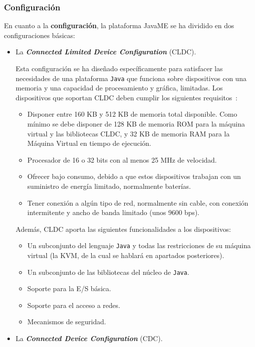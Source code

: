\subsubsection{Configuración}
En cuanto a la \textbf{configuración}, la plataforma \acs{JavaME} se ha
dividido en dos configuraciones básicas:
\begin{itemize}
\item La \emph{\textbf{Connected Limited Device Configuration}} (\acs{CLDC}).

Esta configuración se ha diseñado específicamente para satisfacer las
necesidades de una plataforma \texttt{Java} que funciona sobre dispositivos
con una memoria y una capacidad de procesamiento y gráfica, limitadas.
Los dispositivos que soportan \acs{CLDC} deben cumplir los siguientes
requisitos~\cite{bib:j2me}:
\begin{itemize}
  \item Disponer entre 160 KB y 512 KB de memoria total disponible. Como mínimo
se debe disponer de 128 KB de memoria \acs{ROM} para la máquina virtual
y las bibliotecas \acs{CLDC}, y 32 KB de memoria \acs{RAM} para la Máquina
Virtual en tiempo de ejecución.
  \item Procesador de 16 o 32 bits con al menos 25 MHz de velocidad.
  \item Ofrecer bajo consumo, debido a que estos dispositivos trabajan con un
suministro de energía limitado, normalmente baterías.
  \item Tener conexión a algún tipo de red, normalmente sin cable, con conexión
intermitente y ancho de banda limitado (unos 9600 bps).
\end{itemize}

Además, \acs{CLDC} aporta las siguientes funcionalidades a los dispositivos:
\begin{itemize}
  \item Un subconjunto del lenguaje \texttt{Java} y todas las restricciones
de su máquina virtual (la \acs{KVM}, de la cual se hablará en apartados
posteriores).
  \item Un subconjunto de las bibliotecas del núcleo de \texttt{Java}.
  \item Soporte para la E/S básica.
  \item Soporte para el acceso a redes.
  \item Mecanismos de seguridad.
\end{itemize}

\item La \emph{\textbf{Connected Device Configuration}} (\acs{CDC}).


\end{itemize}
